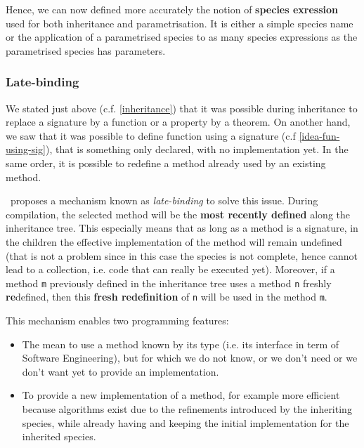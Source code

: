 Hence, we can now defined more accurately the notion of {\bf species
exression} used for both inheritance and parametrisation. It is either
a simple species name or the application of a parametrised species to
as many species expressions as the parametrised species has
parameters.


\subsubsection{Late-binding}
\label{late-binding}
We stated just above (c.f. \ref{inheritance}) that it was possible
during inheritance to replace a signature by a function or a property
by a theorem. On another hand, we saw that it was possible to define
function using a signature (c.f \ref{idea-fun-using-sig}), that is
something only declared, with no implementation yet. In the same
order, it is possible to redefine a method already used by an existing
method.

\smallskip
\focal\ proposes a mechanism known as {\em late-binding} to solve this
issue. During compilation, the selected method will be the {\bf most
recently defined} along the inheritance tree. This especially means
that as long as a method is a signature, in the children the effective
implementation of the method will remain undefined (that is not a
problem since in this case the species is not complete, hence cannot
lead to a collection, i.e. code that can really be executed
yet). Moreover, if a method {\tt m} previously defined in the
inheritance tree uses a method {\tt n} freshly {\bf re}defined, then
this {\bf fresh redefinition} of {\tt n} will be used in the method
{\tt m}.

\smallskip
This mechanism enables two programming features:
\begin{itemize}
  \item The mean to use a method known by its type (i.e. its interface
    in term of Software Engineering), but for which we do not know, or
    we don't need or we don't want yet to provide an implementation.

  \item To provide a new implementation of a method, for example more
    efficient because algorithms exist due to the refinements
    introduced by the inheriting species, while already having and
    keeping the initial implementation for the inherited species.
\end{itemize}




